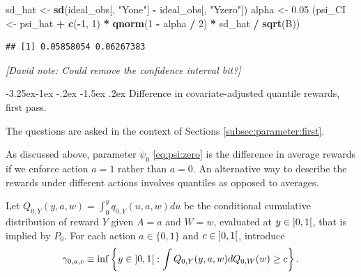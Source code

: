 \documentclass[]{article}
\makeatletter
\newenvironment{Shaded}{\begin{snugshade}}{\end{snugshade}}
\newcommand{\DecValTok}[1]{\textcolor[rgb]{0.00,0.00,0.81}{#1}}
\newcommand{\FloatTok}[1]{\textcolor[rgb]{0.00,0.00,0.81}{#1}}
\newcommand{\KeywordTok}[1]{\textcolor[rgb]{0.13,0.29,0.53}{\textbf{#1}}}
\newcommand{\NormalTok}[1]{#1}
\newcommand{\OperatorTok}[1]{\textcolor[rgb]{0.81,0.36,0.00}{\textbf{#1}}}
\newcommand{\StringTok}[1]{\textcolor[rgb]{0.31,0.60,0.02}{#1}}
\renewcommand\subsection{\@startsection{subsection}{3}{\z@}%
                                     {-3.25ex\@plus -1ex \@minus -.2ex}%
                                     {-1.5ex \@plus .2ex}%
                                     {\normalfont\normalsize\bfseries}}
\newcommand{\gear}{\usebox{\gearbox}\;}
\theoremstyle{definition}
\theoremstyle{definition}
\theoremstyle{definition}
\theoremstyle{remark}
\makeatother
\begin{document}
\begin{Shaded}
\begin{Highlighting}[]
\NormalTok{sd_hat <-}\StringTok{ }\KeywordTok{sd}\NormalTok{(ideal_obs[, }\StringTok{"Yone"}\NormalTok{] }\OperatorTok{-}\StringTok{ }\NormalTok{ideal_obs[, }\StringTok{"Yzero"}\NormalTok{])}
\NormalTok{alpha <-}\StringTok{ }\FloatTok{0.05}
\NormalTok{(psi_CI <-}\StringTok{ }\NormalTok{psi_hat }\OperatorTok{+}\StringTok{ }\KeywordTok{c}\NormalTok{(}\OperatorTok{-}\DecValTok{1}\NormalTok{, }\DecValTok{1}\NormalTok{) }\OperatorTok{*}\StringTok{ }\KeywordTok{qnorm}\NormalTok{(}\DecValTok{1} \OperatorTok{-}\StringTok{ }\NormalTok{alpha }\OperatorTok{/}\StringTok{ }\DecValTok{2}\NormalTok{) }\OperatorTok{*}\StringTok{ }\NormalTok{sd_hat }\OperatorTok{/}\StringTok{ }\KeywordTok{sqrt}\NormalTok{(B))}
\end{Highlighting}
\end{Shaded}

\begin{verbatim}
## [1] 0.05858054 0.06267383
\end{verbatim}

\emph{{[}David note: Could remove the confidence interval bit?{]}}

\subsection{\gear Difference in covariate-adjusted quantile rewards, first
pass.}  
\label{subsec:exo:dave:one}

The questions are asked in the context of Sections
\ref{subsec:parameter:first}.

As discussed above, parameter \(\psi_0\) \eqref{eq:psi:zero} is the
difference in average rewards if we enforce action \(a = 1\) rather than
\(a = 0\). An alternative way to describe the rewards under different
actions involves quantiles as opposed to averages.

Let \(Q_{0,Y}(y, a, w) = \int_{0}^y q_{0,Y}(u, a, w) du\) be the
conditional cumulative distribution of reward \(Y\) given \(A=a\) and
\(W=w\), evaluated at \(y \in \interval[open]{0}{1}\), that is implied
by \(P_0\). For each action \(a \in \{0,1\}\) and
\(c \in \interval[open]{0}{1}\), introduce \begin{equation}
\label{def_quantile}     \gamma_{0,a,c}    \equiv     \inf    \left\{y     \in
\interval[open]{0}{1}  : \int  Q_{0,Y}(y, a,  w) dQ_{0,W}(w)  \ge c  \right\}.
\end{equation}
\end{document}
